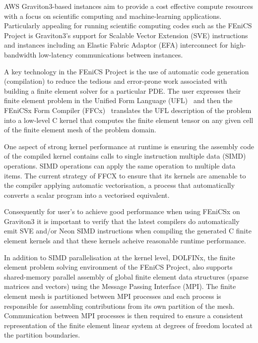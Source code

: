 AWS Graviton3-based instances aim to provide a cost effective compute resources
with a focus on scientific computing and machine-learning applications.
Particularly appealing for running scientific computing codes such as the
FEniCS Project is Graviton3's support for Scalable Vector Extension (SVE)
instructions and instances including an Elastic Fabric Adaptor (EFA)
interconnect for high-bandwidth low-latency communications between instances.

A key technology in the FEniCS Project is the use of automatic code generation
(compilation) to reduce the tedious and error-prone work associated with
building a finite element solver for a particular PDE. The user expresses their
finite element problem in the Unified Form Language
(UFL)~\citep{alnaes_unified_2014} and then the FEniCSx Form Compiler
(FFCx)~\citep{kirby_compiler_2006} translates the UFL description of the problem
into a low-level C kernel that computes the finite element tensor on any given
cell of the finite element mesh of the problem domain.

One aspect of strong kernel performance at runtime is ensuring the assembly
code of the compiled kernel contains calls to single instruction multiple data
(SIMD) operations. SIMD operations can apply the same operation to multiple
data items. The current strategy of FFCX to ensure that its kernels are
amenable to the compiler applying automatic vectorisation, a process that
automatically converts a scalar program into a vectorised equivalent.
 
Consequently for user's to achieve good performance when using FEniCSx on
Graviton3 it is important to verify that the latest compilers do automatically
emit SVE and/or Neon SIMD instructions when compiling the generated C finite
element kernels and that these kernels acheive reasonable runtime performance. 

In addition to SIMD parallelisation at the kernel level, DOLFINx, the finite
element problem solving environment of the FEniCS Project, also supports
shared-memory parallel assembly of global finite element data structures
(sparse matrices and vectors) using the Message Passing Interface (MPI). The
finite element mesh is partitioned between MPI processes and each process is
responsible for assembling contributions from its own partition of the mesh.
Communication between MPI processes is then required to ensure a consistent
representation of the finite element linear system at degrees of freedom
located at the partition boundaries.

